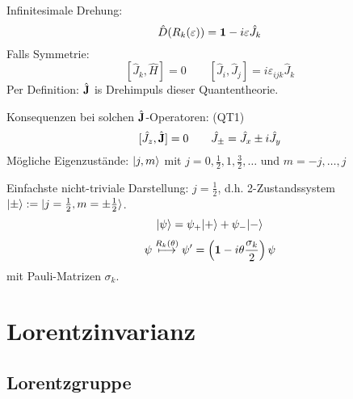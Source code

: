 \documentclass[11pt,a4paper]{report}
\begin{document}
Infinitesimale Drehung:
$$\hat{D}(R_k(\varepsilon ))=\mathbf{1}-i\varepsilon\hat{J}_k$$
Falls Symmetrie:
$$[\hat{J}_k, \hat{H}] = 0\qquad [\hat{J}_i, \hat{J}_j]=i\varepsilon_{ijk}\hat{J}_k$$
Per Definition: $\hat{\mathbf{J}}$ is Drehimpuls dieser Quantentheorie.\par 

Konsequenzen bei solchen $\hat{\mathbf{J}}$-Operatoren: (QT1)
$$[\hat{J}_z, \hat{\mathbf{J}}]=0\qquad \hat{J}_\pm =\hat{J}_x\pm i\hat{J}_y$$
Mögliche Eigenzustände: $|j, m\rangle$ mit $j = 0, \frac{1}{2}, 1, \frac{3}{2}, \ldots$ und $m=-j, \ldots , j$\par 

Einfachste nicht-triviale Darstellung: $j=\frac{1}{2}$, d.h. 2-Zustandssystem $|\pm\rangle:=|j=\frac{1}{2},m=\pm\frac{1}{2}\rangle$.
$$|\psi\rangle=\psi_+|+\rangle+\psi_-|-\rangle$$
$$\psi\overset{R_k(\theta )}{\longmapsto}\psi' = \left(\mathbf{1}-i\theta\frac{\sigma_k}{2}\right)\psi$$
mit Pauli-Matrizen $\sigma_k$.

\section{Lorentzinvarianz}

\subsection{Lorentzgruppe}
\end{document}
